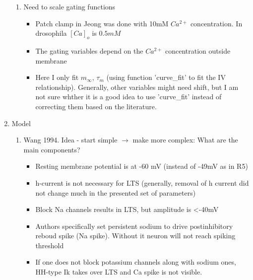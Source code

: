 \documentclass[11pt]{article}
\begin{document}
\begin{enumerate}
\begin{enumerate}
        \item Need to scale gating functions
        \begin{itemize}
            \item Patch clamp in Jeong was done with 10mM $Ca^{2+}$ concentration. In drosophila
            $[Ca]_{o}$ is $0.5mM$
            \item The gating variables depend on the $Ca^{2+}$ concentration outside membrane
            \item Here I only fit $m_\infty$, $\tau_m$ (using function 'curve\_fit' to fit the
            IV relationship). Generally, other variables might need shift, but I am not sure whther
            it is a good idea to use 'curve\_fit' instead of correcting them based on the
            literature.
        \end{itemize}
    \end{enumerate}


    \item Model
    \begin{enumerate}
        \item Wang 1994. Idea - start simple $\rightarrow$ make more complex: What are the main components?
        \begin{itemize}
            \item Resting membrane potential is at -60 mV (instead of -49mV as in R5)
            \item h-current is not necessary for LTS (generally, removal of h current
            did not change much in the presented set of parameters)
            \item Block Na channels results in LTS, but amplitude is <-40mV
            \item Authors specifically set persistent sodium to drive postinhibitory reboud
            spike (Na spike). Without it neuron will not reach spiking threshold
            \item If one does not block potassium channels along with sodium ones, HH-type Ik takes over
            LTS and Ca spike is not visible.
        \end{itemize}
    \end{enumerate}

\end{enumerate}
\end{document}

